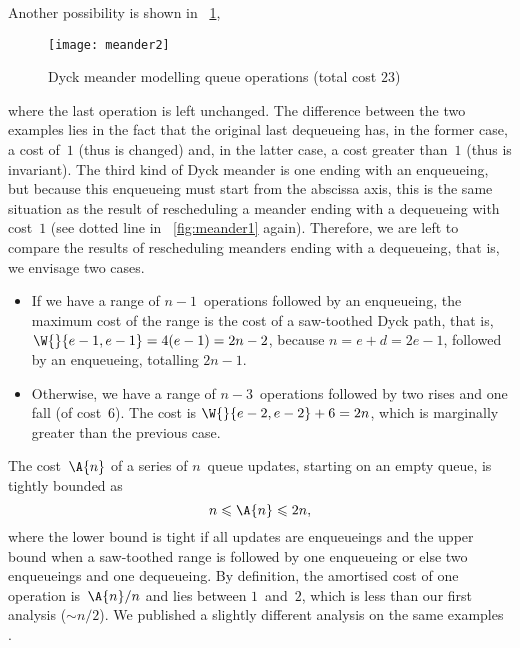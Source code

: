 Another possibility is shown in \fig~\ref{fig:meander2},
\begin{figure}[t]
\centering
\texttt{[image: meander2]}
\caption{Dyck meander modelling queue operations (total cost \(23\))}
\label{fig:meander2}
\end{figure}
where the last operation is left unchanged. The difference between the
two examples lies in the fact that the original last dequeueing has,
in the former case, a cost of~\(1\) (thus is changed) and, in the
latter case, a cost greater than~\(1\) (thus is invariant). The third
kind of Dyck meander is one ending with an enqueueing, but because
this enqueueing must start from the abscissa axis, this is the same
situation as the result of rescheduling a meander ending with a
dequeueing with cost~\(1\) (see dotted line in \fig~\ref{fig:meander1}
again). Therefore, we are left to compare the results of rescheduling
meanders ending with a dequeueing, that is, we envisage two cases.
\begin{itemize}

  \item If we have a range of \(n-1\)~operations followed by an
    enqueueing, the maximum cost of the range is the cost of a
    saw\hyp{}toothed Dyck path, that is,
    \(\W{}{e-1,e-1}=4(e-1)=2n-2\), because \(n=e+d=2e-1\), followed by
    an enqueueing, totalling \(2n-1\).

  \item Otherwise, we have a range of \(n-3\)~operations followed by
    two rises and one fall (of cost~\(6\)). The cost is
    \(\W{}{e-2,e-2}+6=2n\), which is marginally greater than the
    previous case.

\end{itemize}


The cost~\(\A{n}\) of a series of \(n\)~queue updates, starting on an
empty queue, is tightly bounded as
\begin{equation*}
n \leqslant \A{n} \leqslant 2n,
\end{equation*}
where the lower bound is tight if all updates are enqueueings and the
upper bound when a saw\hyp{}toothed range is followed by one
enqueueing or else two enqueueings and one dequeueing. By definition,
the amortised cost of one operation is~\(\A{n}/n\) and lies between
\(1\)~and~\(2\), which is less than our first analysis (\(\sim
n/2\)). We published a slightly different analysis on the same
examples \citep{Rinderknecht_2011}.

